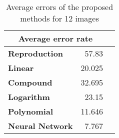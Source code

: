 \begin{table}[H]
  \begin{center}
  \resizebox{5cm}{!} {
    \begin{tabular}{l r r}
    \multicolumn{2}{c}{\textbf{Average error rate}} \\ \hline 
        \textbf{Reproduction} & 57.83\\ 
        \textbf{Linear} & 20.025\\ 
        \textbf{Compound} & 32.695\\ 
        \textbf{Logarithm} & 23.15\\ 
        \textbf{Polynomial} & 11.646\\ 
        \textbf{Neural Network} & 7.767\\ 
    \end{tabular}
  }
  \caption{Average errors of the proposed methods for 12 images }
  \end{center}
\end{table}
